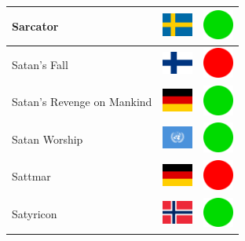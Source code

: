 \documentclass[12pt, a4paper, twoside]{report}
\begin{document}
\begin{center}
\begin{longtable}{|p{5cm}|p{2cm}|p{2cm}|}
 Sarcator                                                   & \includegraphics[width=1cm]{../img/flags/se} &   \includegraphics[width=1cm]{../likes/y} \\ \hline
 Satan's Fall                                               & \includegraphics[width=1cm]{../img/flags/fi} &   \includegraphics[width=1cm]{../likes/n} \\ \hline
 Satan's Revenge on Mankind                                 & \includegraphics[width=1cm]{../img/flags/de} &   \includegraphics[width=1cm]{../likes/y} \\ \hline
 Satan Worship                                              & \includegraphics[width=1cm]{../img/flags/un} &   \includegraphics[width=1cm]{../likes/y} \\ \hline
 Sattmar                                                    & \includegraphics[width=1cm]{../img/flags/de} &   \includegraphics[width=1cm]{../likes/n} \\ \hline
 Satyricon                                                  & \includegraphics[width=1cm]{../img/flags/no} &   \includegraphics[width=1cm]{../likes/y} \\ \hline

\end{longtable}
\end{center}
\end{document}
